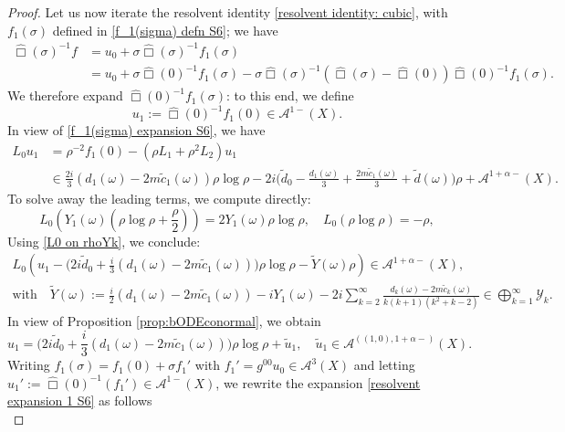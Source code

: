 \documentclass[10pt,a4paper,reqno]{amsart}
\newcommand{\A}{\mathcal{A}}
\theoremstyle{definition}
\theoremstyle{remark}
\numberwithin{equation}{section}
\newcommand{\wh}{\widehat}
\begin{document}
\begin{proof}
\noindent
Let us now iterate the resolvent identity \eqref{resolvent identity: cubic}, with $f_1(\sigma)$ defined in \eqref{f_1(sigma) defn S6}; we have
\begin{equation}
\label{resolvent expansion 1 S6}
\begin{split}
    \wh\Box(\sigma)^{-1} f &= u_0 + \sigma\wh\Box(\sigma)^{-1} f_1(\sigma) \\
    &= u_0 + \sigma\wh\Box(0)^{-1} f_1(\sigma) - \sigma\wh\Box(\sigma)^{-1} (\wh\Box(\sigma)-\wh\Box(0))\wh\Box(0)^{-1} f_1(\sigma).
\end{split}
\end{equation}
We therefore expand $\wh\Box(0)^{-1} f_1(\sigma)$: to this end, we define
\[
    u_1 := \wh\Box(0)^{-1}f_1(0) \in \A^{1-}(X).
\]
In view of \eqref{f_1(sigma) expansion S6}, we have 
\[
\begin{split}
    L_0 u_1 &= \rho^{-2} f_1(0) - (\rho L_1 + \rho^2 L_2)u_1 \\
    &\in \frac{2i}{3}(d_1(\omega)-2m\tilde{c}_1(\omega))\rho\log\rho - 2i\bigl(\tilde{d}_0 -\frac{d_1(\omega)}{3}+\frac{2m\tilde{c}_1(\omega)}{3}+\tilde{d}(\omega)\bigr)\rho + \A^{1+\alpha-}(X).
\end{split}
\]
To solve away the leading terms, we compute directly:
\[
    L_0(Y_1(\omega)(\rho\log\rho + \dfrac{\rho}{2})) = 2Y_1(\omega)\rho\log\rho,\quad L_0(\rho\log\rho) = -\rho,
\]
Using \eqref{L0 on rhoYk}, we conclude:
\[
\begin{gathered}
	L_0 \left(u_1 - \bigl(2i\tilde{d}_0 + \frac{i}{3}(d_1(\omega)-2m\tilde{c}_1(\omega))\bigr)\rho\log\rho - \widetilde{Y}(\omega)\rho \right) \in \A^{1+\alpha-}(X), \\
	\text{with}\quad \widetilde{Y}(\omega) := \frac{i}{2}(d_1(\omega)-2m\tilde{c}_1(\omega))-iY_1(\omega) - 2i\sum_{k=2}^\infty \frac{d_{k}(\omega)-2m\tilde{c}_k(\omega)}{k(k+1)(k^2 + k -2)} \in \bigoplus_{k=1}^\infty \mathcal{Y}_k.
\end{gathered}
\]
In view of Proposition \ref{prop:bODEconormal}, we obtain
\begin{equation}
\label{u_1 expansion S6}
    u_1 = \bigl(2i\tilde{d}_0 + \frac{i}{3}(d_1(\omega)-2m\tilde{c}_1(\omega))\bigr)\rho\log\rho + \tilde{u}_1,\quad \tilde{u}_1 \in \A^{((1,0),1+\alpha-)}(X).
\end{equation}
Writing $f_1(\sigma) = f_1(0) + \sigma f_1'$ with $f_1'=g^{00}u_0 \in \A^3(X)$ and letting $u_1' :=\wh\Box(0)^{-1}(f_1')\in\A^{1-}(X)$, we rewrite the expansion \eqref{resolvent expansion 1 S6} as follows
\begin{equation}

\end{equation}
\end{proof}
\end{document}
